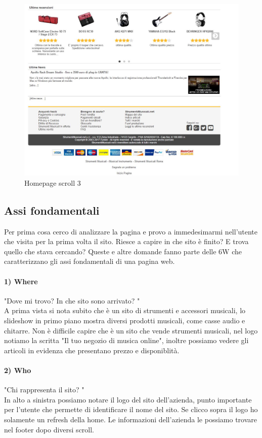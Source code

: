 \documentclass[12pt]{article}
\begin{document}
	\begin{figure}
		\centering	
		\includegraphics[width=150mm]{images/home3.png}%
		\caption{Homepage scroll 3}
	\end{figure}
	\newpage
	\subsection{Assi fondamentali}
	\vspace{0.5cm}
	Per prima cosa cerco di analizzare la pagina e provo a immedesimarmi nell'utente che visita per la prima volta il sito. Riesce a capire in che sito è finito? E trova quello che stava cercando?  Queste e altre domande fanno parte delle 6W che caratterizzano gli assi fondamentali di una pagina web.
	\paragraph{1) Where} "Dove mi trovo? In che sito sono arrivato? "
	\\ 
	A prima vista si nota subito che è un sito di strumenti e accessori musicali, lo slideshow in primo piano mostra diversi prodotti musicali, come casse audio e chitarre. Non è difficile capire che è un sito che vende strumenti musicali, nel logo notiamo la scritta "Il tuo negozio di musica online", inoltre possiamo vedere gli articoli in evidenza che presentano prezzo e disponiblità.
	\paragraph{2) Who} "Chi rappresenta il sito? "
	\\
	In alto a sinistra possiamo notare il logo del sito dell'azienda, punto importante per l'utente che permette di identificare il nome del sito. Se clicco sopra il logo ho solamente un refresh della home. Le informazioni dell'azienda le possiamo trovare nel footer dopo diversi scroll. 
	\\
\end{document}
